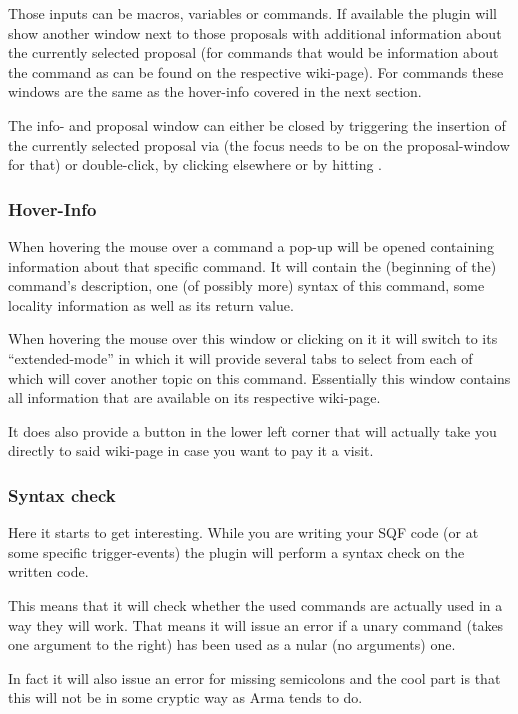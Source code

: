 \documentclass[twoside=false]{scrbook}
\newcommand{\arma}{Arma\xspace}
\newcommand{\button}[1]{\menu{\inlinegraphic{#1}}}
\newlength\myheight
\newlength\mydepth
\newcommand{\inlinegraphic}[1]{%
  \settototalheight\myheight{Xygp}%
  \settodepth\mydepth{Xygp}%
  \raisebox{-\mydepth}{\texttt{[image: \#1]}}%
}
\begin{document}
	Those inputs can be macros, variables or commands. If available the plugin will show another window next to those proposals with additional information about the currently selected proposal (for commands that would be information about the command as can be found on the respective wiki-page). For commands these windows are the same as the hover-info covered in the next section.
	
	The info- and proposal window can either be closed by triggering the insertion of the currently selected proposal via \keys{\return} (the focus needs to be on the proposal-window for that) or double-click, by clicking elsewhere or by hitting \keys{\esc}.
	
	
	\subsubsection{Hover-Info}
	When hovering the mouse over a command a pop-up will be opened containing information about that specific command. It will contain the (beginning of the) command's description, one (of possibly more) syntax of this command, some locality information as well as its return value.
	
	When hovering the mouse over this window or clicking on it it will switch to its “extended-mode” in which it will provide several tabs to select from each of which will cover another topic on this command. Essentially this window contains all information that are available on its respective wiki-page.
	
	It does also provide a button \button{images/sqdevWikiIcon.png} in the lower left corner that will actually take you directly to said wiki-page in case you want to pay it a visit.
	
	
	\subsubsection{Syntax check}
	Here it starts to get interesting. While you are writing your SQF code (or at some specific trigger-events) the plugin will perform a syntax check on the written code.
	
	This means that it will check whether the used commands are actually used in a way they will work. That means it will issue an error if a unary command (takes one argument to the right) has been used as a nular (no arguments) one.
	
	In fact it will also issue an error for missing semicolons and the cool part is that this will not be in some cryptic way as \arma tends to do.
	
\end{document}

